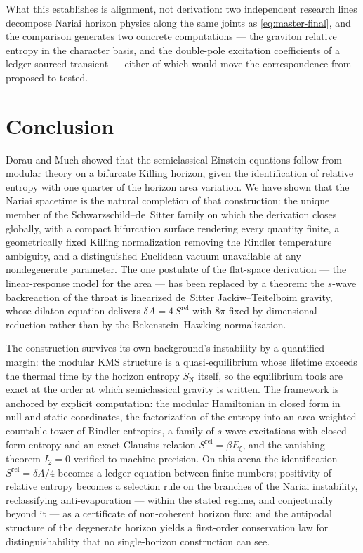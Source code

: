 \documentclass[11pt]{article}
\newcommand{\Srel}{S^{\mathrm{rel}}}
\newcommand{\Nariai}{Nariai}
\begin{document}
What this establishes is alignment, not derivation: two independent research lines decompose \Nariai{} horizon physics along the same joints as \eqref{eq:master-final}, and the comparison generates two concrete computations --- the graviton relative entropy in the character basis, and the double-pole excitation coefficients of a ledger-sourced transient --- either of which would move the correspondence from proposed to tested.


\section{Conclusion}
\label{sec:conclusion}

Dorau and Much showed that the semiclassical Einstein equations follow from modular theory on a bifurcate Killing horizon, given the identification of relative entropy with one quarter of the horizon area variation. We have shown that the \Nariai{} spacetime is the natural completion of that construction: the unique member of the Schwarzschild--de~Sitter family on which the derivation closes globally, with a compact bifurcation surface rendering every quantity finite, a geometrically fixed Killing normalization removing the Rindler temperature ambiguity, and a distinguished Euclidean vacuum unavailable at any nondegenerate parameter. The one postulate of the flat-space derivation --- the linear-response model for the area --- has been replaced by a theorem: the $s$-wave backreaction of the throat is linearized de~Sitter Jackiw--Teitelboim gravity, whose dilaton equation delivers $\delta A = 4\,\Srel$ with $8\pi$ fixed by dimensional reduction rather than by the Bekenstein--Hawking normalization.

The construction survives its own background's instability by a quantified margin: the modular KMS structure is a quasi-equilibrium whose lifetime exceeds the thermal time by the horizon entropy $S_{\mathrm{N}}$ itself, so the equilibrium tools are exact at the order at which semiclassical gravity is written. The framework is anchored by explicit computation: the modular Hamiltonian in closed form in null and static coordinates, the factorization of the entropy into an area-weighted countable tower of Rindler entropies, a family of $s$-wave excitations with closed-form entropy and an exact Clausius relation $\Srel = \beta E_\xi$, and the vanishing theorem $I_2 = 0$ verified to machine precision. On this arena the identification $\Srel = \delta A/4$ becomes a ledger equation between finite numbers; positivity of relative entropy becomes a selection rule on the branches of the \Nariai{} instability, reclassifying anti-evaporation --- within the stated regime, and conjecturally beyond it --- as a certificate of non-coherent horizon flux; and the antipodal structure of the degenerate horizon yields a first-order conservation law for distinguishability that no single-horizon construction can see.
\end{document}
